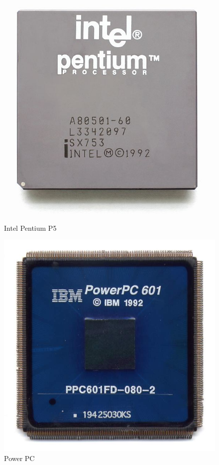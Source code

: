 \begin{figure}
  \begin{center}
    \includegraphics[scale=0.2]{pentium.jpg}
  \end{center}
  \caption{Intel Pentium P5}
  \begin{center}
    \includegraphics[scale=1.5]{powerpc.jpg}
  \end{center}
  \caption{Power PC}
\end{figure} 
 
